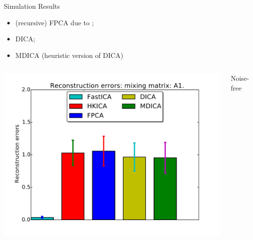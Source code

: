 \documentclass[final]{beamer} %
\newcommand{\bc}{\begin{center}}
\newcommand{\ec}{\end{center}}
\begin{document}
\begin{frame}[c]
\begin{columns}[t,totalwidth=\textwidth]
\begin{column}{0.32\textwidth}
\begin{block}{Simulation Results}
\begin{itemize}
				\item (recursive) FPCA due to \citet{vempala2014max};
				\item DICA; 
				\item MDICA (heuristic version of DICA)
			\end{itemize}
			\begin{columns}[t]
			\includegraphics[width=\textwidth]{barchart-A1-noisefree}
			\bc
			Noise-free
			\ec
			

\end{columns}
\end{block}
\end{column}
\end{columns}
\end{frame}
\end{document}
